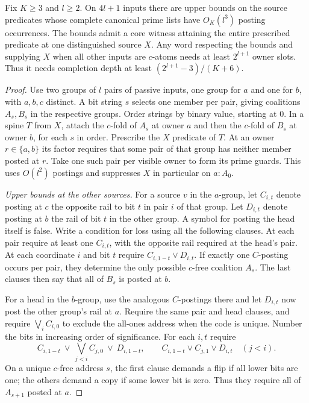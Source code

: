 \begin{theorem}
\label{core:thm:compact-depth-upper-bounds}
Fix $K\ge3$ and $l\ge2$. On $4l+1$ inputs there are upper bounds on
the source predicates whose complete canonical prime lists have
$O_K(l^3)$ posting occurrences. The bounds admit a core witness
attaining the entire prescribed predicate at one distinguished
source $X$. Any word respecting the bounds and supplying $X$ when
all other inputs are $c$-atoms needs at least $2^{l+1}$ owner slots.
Thus it needs completion depth at least $(2^{l+1}-3)/(K+6)$.
\end{theorem}
\begin{proof}
Use two groups of $l$ pairs of passive inputs, one group for $a$ and
one for $b$, with $a,b,c$ distinct. A bit string $s$ selects one member
per pair, giving coalitions $A_s,B_s$ in the respective groups. Order
strings by binary value, starting at $0$. In a spine $T$ from $X$,
attach the $c$-fold of $A_s$ at owner $a$ and then the $c$-fold of
$B_s$ at owner $b$, for each $s$ in order. Prescribe the $X$ predicate
of $T$. At an owner $r\in\{a,b\}$ its factor requires that some pair
of that group has neither member posted at $r$. Take one such pair
per visible owner to form its prime guards. This uses $O(l^2)$
postings and suppresses $X$ in particular on $a:A_0$.

\emph{Upper bounds at the other sources.}
For a source $v$ in the $a$-group, let $C_{i,t}$ denote posting at $c$
the opposite rail to bit $t$ in pair $i$ of that group. Let $D_{i,t}$
denote posting at $b$ the rail of bit $t$ in the other group. A
symbol for posting the head itself is false. Write a condition for
loss using all the following clauses. At each pair require at least
one $C_{i,t}$, with the opposite rail required at the head's pair.
At each coordinate $i$ and bit $t$ require
$C_{i,1-t}\lor D_{i,t}$. If exactly one $C$-posting occurs per pair,
they determine the only possible $c$-free coalition $A_s$. The last
clauses then say that all of $B_s$ is posted at $b$.

For a head in the $b$-group, use the analogous $C$-postings there and
let $D_{i,t}$ now post the other group's rail at $a$. Require the
same pair and head clauses, and require $\bigvee_i C_{i,0}$ to exclude
the all-ones address when the code is unique. Number the bits in
increasing order of significance. For each $i,t$ require
\[
 C_{i,1-t}\ \lor\ \bigvee_{j<i} C_{j,0}\ \lor\ D_{i,1-t},
 \qquad C_{i,1-t}\lor C_{j,1}\lor D_{i,t}\quad(j<i).
\]
On a unique $c$-free address $s$, the first clause demands a flip
if all lower bits are one; the others demand a copy if some lower
bit is zero. Thus they require all of $A_{s+1}$ posted at $a$.


\end{proof}
